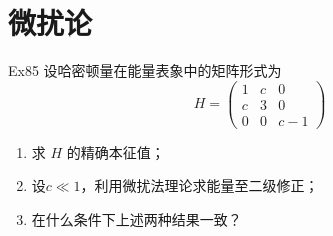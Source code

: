\section{微扰论}

\begin{question}{Ex85}
    设哈密顿量在能量表象中的矩阵形式为
    $$
        H=\begin{pmatrix}
            1 & c & 0   \\
            c & 3 & 0   \\
            0 & 0 & c-1
        \end{pmatrix}
    $$
    \begin{enumerate}
        \item 求 $H$ 的精确本征值；
        \item 设$c \ll 1$，利用微扰法理论求能量至二级修正；
        \item 在什么条件下上述两种结果一致？
    \end{enumerate}
\end{question}



